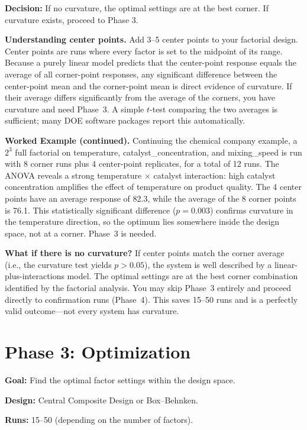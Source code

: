 \documentclass[11pt]{book}
\begin{document}
\textbf{Decision:} If no curvature, the optimal settings are at the best corner.
If curvature exists, proceed to Phase 3.

\medskip
\noindent\textbf{Understanding center points.}
Add 3--5 center points to your factorial design. Center points are runs where
every factor is set to the midpoint of its range. Because a purely linear model
predicts that the center-point response equals the average of all corner-point
responses, any significant difference between the center-point mean and the
corner-point mean is direct evidence of curvature. If their average differs
significantly from the average of the corners, you have curvature and need
Phase~3. A simple $t$-test comparing the two averages is sufficient; many DOE
software packages report this automatically.

\medskip
\noindent\textbf{Worked Example (continued).}
Continuing the chemical company example, a $2^3$ full factorial on
temperature, catalyst\_concentration, and mixing\_speed is run with 8 corner
runs plus 4 center-point replicates, for a total of 12 runs. The ANOVA
reveals a strong temperature $\times$ catalyst interaction: high catalyst
concentration amplifies the effect of temperature on product quality. The
4 center points have an average response of 82.3, while the average of the
8 corner points is 76.1. This statistically significant difference
($p = 0.003$) confirms curvature in the temperature direction, so the
optimum lies somewhere inside the design space, not at a corner. Phase~3 is
needed.

\medskip
\noindent\textbf{What if there is no curvature?}
If center points match the corner average (i.e., the curvature test yields
$p > 0.05$), the system is well described by a linear-plus-interactions model.
The optimal settings are at the best corner combination identified by the
factorial analysis. You may skip Phase~3 entirely and proceed directly to
confirmation runs (Phase~4). This saves 15--50 runs and is a perfectly valid
outcome---not every system has curvature.

\section{Phase 3: Optimization}

\textbf{Goal:} Find the optimal factor settings within the design space.

\textbf{Design:} Central Composite Design or Box--Behnken.

\textbf{Runs:} 15--50 (depending on the number of factors).
\end{document}
